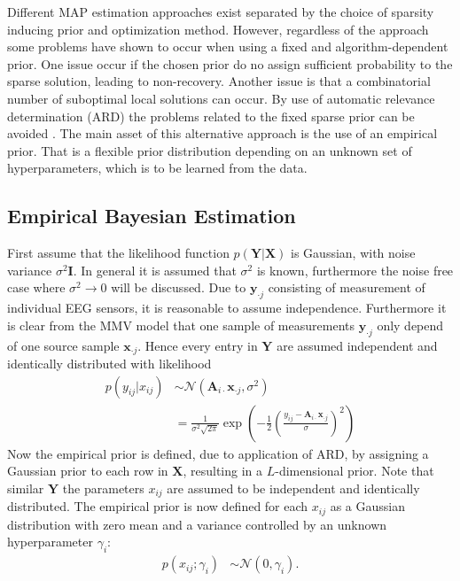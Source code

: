 Different MAP estimation approaches exist separated by the choice of sparsity inducing prior and optimization method. 
However, regardless of the approach some problems have shown to occur when using a fixed and algorithm-dependent prior. 
One issue occur if the chosen prior do no assign sufficient probability to the sparse solution, leading to non-recovery.
Another issue is that a combinatorial number of suboptimal local solutions can occur.
By use of automatic relevance determination (ARD) the problems related to the fixed sparse prior can be avoided \cite[p. 20]{phd_wipf}. 
The main asset of this alternative approach is the use of an empirical prior. 
That is a flexible prior distribution depending on an unknown set of hyperparameters, which is to be learned from the data.
 
\subsection{Empirical Bayesian Estimation}\label{seg:EBE}
First assume that the likelihood function $p(\mathbf{Y} \vert \mathbf{X})$ is Gaussian, with noise variance $\sigma^2\textbf{I}$. In general it is assumed that $\sigma^2$ is known, furthermore the noise free case where $\sigma^2 \rightarrow 0$ will be discussed.  
Due to $\textbf{y}_{\cdot j}$ consisting of measurement of individual EEG sensors, it is reasonable to assume independence. Furthermore it is clear from the MMV model that one sample of measurements $\textbf{y}_{\cdot j}$ only depend of one source sample $\textbf{x}_{\cdot j}$. Hence every entry in $\textbf{Y}$ are assumed independent and identically distributed with likelihood 
\begin{align*}
p(y_{ij}\vert x_{ij}) &\sim \mathcal{N}(\mathbf{A}_{i \cdot}\textbf{x}_{\cdot j}, \sigma^2) \\
& = \frac{1}{\sigma^2\sqrt{2\pi}}\exp\left( -\frac{1}{2}\left( \frac{y_{ij}- \mathbf{A}_{i \cdot}\textbf{x}_{\cdot j}}{\sigma}\right)^{2}\right)
\end{align*}
Now the empirical prior is defined, due to application of ARD, by assigning a Gaussian prior to each row in $\textbf{X}$, resulting in a $L$-dimensional prior. Note that similar $\textbf{Y}$ the parameters $x_{ij}$ are assumed to be independent and identically distributed.
The empirical prior is now defined for each $x_{ij}$ as a Gaussian distribution with zero mean and a variance controlled by an unknown hyperparameter $\gamma_i$:
\begin{align*}
p (x_{i j} ; \gamma_i) &\sim \mathcal{N}(0, \gamma_i).
\end{align*}

